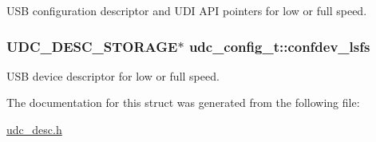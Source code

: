 \-U\-S\-B configuration descriptor and \-U\-D\-I \-A\-P\-I pointers for low or full speed. 

\hypertarget{structudc__config__t_abbb89807817f4e602e20c6ebdfb26741}{
\subsubsection[{confdev\-\_\-lsfs}]{ \-U\-D\-C\-\_\-\-D\-E\-S\-C\-\_\-\-S\-T\-O\-R\-A\-G\-E$\ast$ {\bf udc\-\_\-config\-\_\-t\-::confdev\-\_\-lsfs}}}
\label{structudc__config__t_abbb89807817f4e602e20c6ebdfb26741}


\-U\-S\-B device descriptor for low or full speed. 



\-The documentation for this struct was generated from the following file\-:\begin{DoxyCompactItemize}
\item 
\hyperlink{udc__desc_8h}{udc\-\_\-desc.\-h}\end{DoxyCompactItemize}
